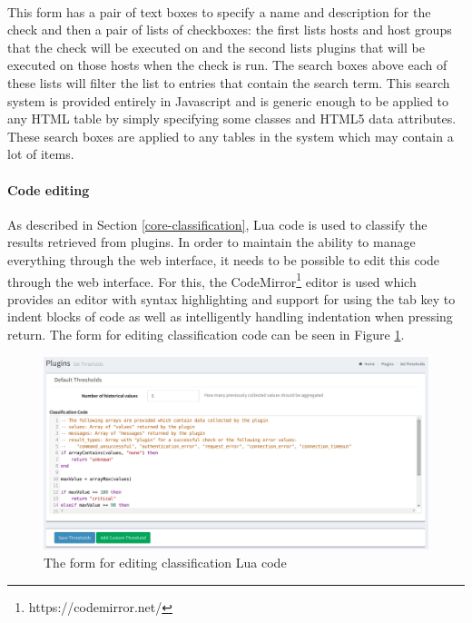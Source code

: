 \documentclass[bsc,logo,twoside,singlespacing,notimes]{infthesis}
\begin{document}
\paragraph*{}
	This form has a pair of text boxes to specify a name and description for the
	check and then a pair of lists of checkboxes: the first lists hosts and host
	groups that the check will be executed on and the second lists plugins that
	will be executed on those hosts when the check is run.  The search boxes above
	each of these lists will filter the list to entries that contain the search
	term. This search system is provided entirely in Javascript and is generic
	enough to be applied to any HTML table by simply specifying some classes and
	HTML5 data attributes.  These search boxes are applied to any tables in the
	system which may contain a lot of items.
	
\paragraph*{Code editing}
	As described in Section \ref{core-classification}, Lua code is used to classify
	the results retrieved from plugins.  In order to maintain the ability to manage
	everything through the web interface, it needs to be possible to edit this code
	through the web interface.  For this, the
	CodeMirror\footnote{https://codemirror.net/} editor is used which provides an
	editor with syntax highlighting and support for using the tab key to indent
	blocks of code as well as intelligently handling indentation when pressing
	return.  The form for editing classification code can be seen in Figure
	\ref{set-thresholds}.

\begin{figure}[H]
	\caption{The form for editing classification Lua code}
	\label{set-thresholds}
	\includegraphics[scale=0.45]{assets/screenshots/set-thresholds.pdf}
\end{figure}
\end{document}
